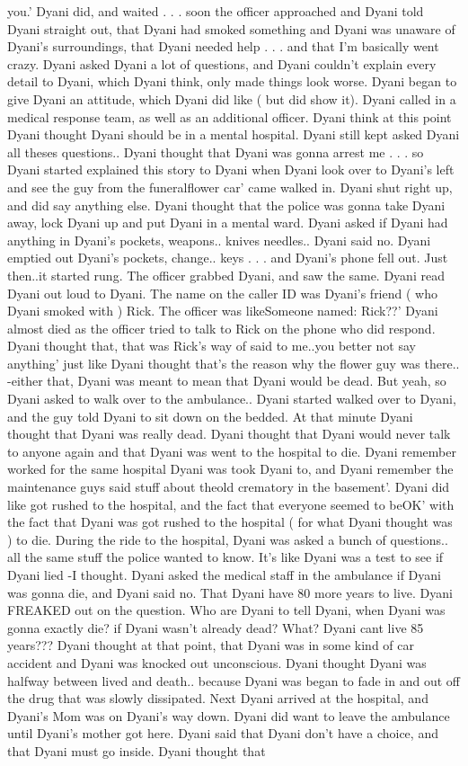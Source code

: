 \documentclass[12pt]{book}
\begin{document}
you.' Dyani did, and waited . . .  soon the officer approached and Dyani told Dyani straight out, that Dyani had smoked something and Dyani was unaware of Dyani's surroundings, that Dyani needed help . . .  and that I'm basically went crazy. Dyani asked Dyani a lot of questions, and Dyani couldn't explain every detail to Dyani, which Dyani think, only made things look worse. Dyani began to give Dyani an attitude, which Dyani did like ( but did show it). Dyani called in a medical response team, as well as an additional officer. Dyani think at this point Dyani thought Dyani should be in a mental hospital. Dyani still kept asked Dyani all theses questions.. Dyani thought that Dyani was gonna arrest me . . .  so Dyani started explained this story to Dyani when Dyani look over to Dyani's left and see the guy from the funeralflower car' came walked in. Dyani shut right up, and did say anything else. Dyani thought that the police was gonna take Dyani away, lock Dyani up and put Dyani in a mental ward. Dyani asked if Dyani had anything in Dyani's pockets, weapons.. knives needles.. Dyani said no. Dyani emptied out Dyani's pockets, change.. keys  . . .  and Dyani's phone fell out. Just then..it started rung. The officer grabbed Dyani, and saw the same. Dyani read Dyani out loud to Dyani. The name on the caller ID was Dyani's friend ( who Dyani smoked with ) Rick. The officer was likeSomeone named: Rick??' Dyani almost died as the officer tried to talk to Rick on the phone who did respond. Dyani thought that, that was Rick's way of said to me..you better not say anything' just like Dyani thought that's the reason why the flower guy was there.. -either that, Dyani was meant to mean that Dyani would be dead. But yeah, so Dyani asked to walk over to the ambulance.. Dyani started walked over to Dyani, and the guy told Dyani to sit down on the bedded. At that minute Dyani thought that Dyani was really dead. Dyani thought that Dyani would never talk to anyone again and that Dyani was went to the hospital to die. Dyani remember worked for the same hospital Dyani was took Dyani to, and Dyani remember the maintenance guys said stuff about theold crematory in the basement'. Dyani did like got rushed to the hospital, and the fact that everyone seemed to beOK' with the fact that Dyani was got rushed to the hospital ( for what Dyani thought was ) to die. During the ride to the hospital, Dyani was asked a bunch of questions.. all the same stuff the police wanted to know. It's like Dyani was a test to see if Dyani lied -I thought. Dyani asked the medical staff in the ambulance if Dyani was gonna die, and Dyani said no. That Dyani have 80 more years to live. Dyani FREAKED out on the question. Who are Dyani to tell Dyani, when Dyani was gonna exactly die? if Dyani wasn't already dead? What? Dyani cant live 85 years??? Dyani thought at that point, that Dyani was in some kind of car accident and Dyani was knocked out unconscious. Dyani thought Dyani was halfway between lived and death.. because Dyani was began to fade in and out off the drug that was slowly dissipated. Next Dyani arrived at the hospital, and Dyani's Mom was on Dyani's way down. Dyani did want to leave the ambulance until Dyani's mother got here. Dyani said that Dyani don't have a choice, and that Dyani must go inside. Dyani thought that 
\end{document}
